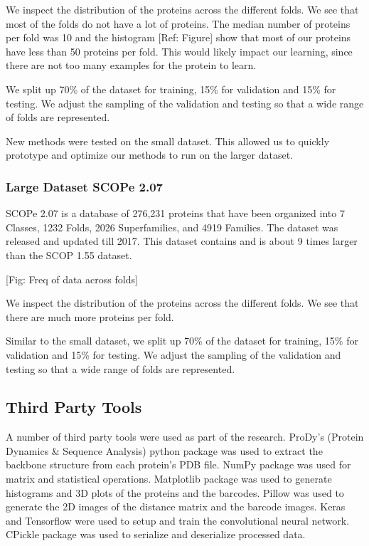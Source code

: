 \documentclass[12pt, a4paper, twocolumn, fullpage]{article}
\theoremstyle{plain}
\theoremstyle{definition}
\theoremstyle{remark}
\begin{document}
We inspect the distribution of the proteins across the different folds. We see that most of the folds do not have a lot of proteins. The median number of proteins per fold was 10 and the histogram [Ref: Figure] show that most of our proteins have less than 50 proteins per fold. This would likely impact our learning, since there are not too many examples for the protein to learn.

We split up 70\% of the dataset for training, 15\% for validation and 15\% for testing. We adjust the sampling of the validation and testing so that a wide range of folds are represented.

New methods were tested on the small dataset. This allowed us to quickly prototype and optimize our methods to run on the larger dataset.

\subsubsection{Large Dataset SCOPe 2.07}

SCOPe 2.07 is a database of 276,231 proteins that have been organized into 7 Classes, 1232 Folds, 2026 Superfamilies, and 4919 Families. The dataset was released and updated till 2017. This dataset contains and is about 9 times larger than the SCOP 1.55 dataset.

[Fig: Freq of data across folds]

We inspect the distribution of the proteins across the different folds. We see that there are much more proteins per fold.

Similar to the small dataset, we split up 70\% of the dataset for training, 15\% for validation and 15\% for testing. We adjust the sampling of the validation and testing so that a wide range of folds are represented.
	
\subsection{Third Party Tools}

A number of third party tools were used as part of the research. ProDy's (Protein Dynamics \& Sequence Analysis) python package was used to extract the backbone structure from each protein's PDB file. NumPy package was used for matrix  and statistical operations. Matplotlib package was used to generate histograms and 3D plots of the proteins and the barcodes. Pillow was used to generate the 2D images of the distance matrix and the barcode images. Keras and Tensorflow were used to setup and train the convolutional neural network. CPickle package was used to serialize and deserialize processed data.
	
\end{document}
